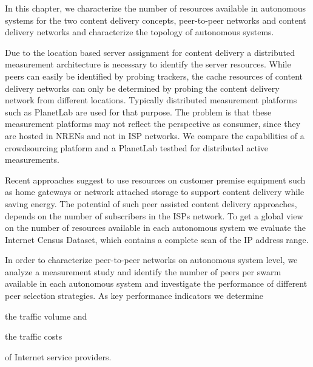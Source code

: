In this chapter, we characterize the number of resources available in autonomous systems for the two content delivery concepts, peer-to-peer networks and content delivery networks and characterize the topology of autonomous systems.

Due to the location based server assignment for content delivery a distributed measurement architecture is necessary to identify the server resources.
While peers can easily be identified by probing trackers, the cache resources of content delivery networks can only be determined by probing the content delivery network from different locations.
Typically distributed measurement platforms such as PlanetLab are used for that purpose.
The problem is that these measurement platforms may not reflect the perspective as consumer, since they are hosted in NRENs and not in ISP networks.
We compare the capabilities of a crowdsourcing platform and a PlanetLab testbed for distributed active measurements.

Recent approaches \cite{valancius2009greening} suggest to use resources on customer premise equipment such as home gateways or network attached storage to support content delivery while saving energy.
The potential of such peer assisted content delivery approaches, depends on the number of subscribers in the ISPs network.
To get a global view on the number of resources available in each autonomous system we evaluate the Internet Census Dataset, which contains a complete scan of the IP address range.

In order to characterize peer-to-peer networks on autonomous system level,
we analyze a measurement study and identify the number of peers per swarm available in each autonomous system and investigate the performance of different peer selection strategies.
As key performance indicators we determine
\begin{enumerate*}
\item the traffic volume and
\item the traffic costs
\end{enumerate*}
of Internet service providers.

